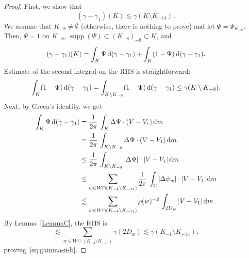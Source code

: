 \documentclass[11pt]{amsart}
\numberwithin{equation}{section}
\newcommand{\bC}{\mathbb C}
\begin{document}
\begin{proof}
First, we show that
\begin{equation}\label{eq:gamma-u-b}
(\gamma - \gamma_1)(K) \lesssim \gamma(K\setminus K_{-14})\,.
\end{equation}
We assume that $K_{-8}\ne\emptyset$ (otherwise, there is nothing to prove) and let
$\Psi=\Psi_{K_{-8}}$.  Then, $\Psi = 1 $ on $K_{-8}$,
$\operatorname{supp}(\Psi) \subset (K_{-8})_{+8} \subset K$, and
\[
(\gamma-\gamma_1)(K) = \int_K \Psi\, {\rm d}(\gamma-\gamma_1) + \int_K (1-\Psi)\, {\rm d}(\gamma-\gamma_1).
\]
Estimate of the second integral on the RHS is straightforward:
\[
\int_K (1-\Psi)\, {\rm d}(\gamma-\gamma_1) = \int_{K\setminus K_{-8}} (1-\Psi)\,
{\rm d}(\gamma-\gamma_1) \le \gamma (K\setminus K_{-8}).
\]
Next, by Green's identity, we get
\begin{align*}
\int_K \Psi\, {\rm d}(\gamma-\gamma_1) &= \frac1{2\pi}\, \int_K \Delta\Psi \cdot (V-V_1)\, {\rm d}m \\
&= \frac1{2\pi}\, \int_{K\setminus K_{-8}} \Delta\Psi \cdot (V-V_1)\, {\rm d}m \\
&\le \frac1{2\pi}\,  \int_{K\setminus K_{-8}} |\Delta\Psi| \cdot |V-V_1|\, {\rm d}m \\
&\le \sum_{w\in W\cap(K_{-4}\setminus K_{-11})} \frac1{2\pi}\, \int_{\bC} |\Delta\psi_w|\cdot |V-V_1|\,
{\rm d}m \\
&\lesssim \sum_{w\in W\cap(K_{-4}\setminus K_{-11})} \rho(w)^{-2}\, \int_{2D_w} |V-V_1|\, {\rm d}m\,.
\end{align*}
By Lemma~\ref{LemmaC}, the RHS is
\[
\lesssim \sum_{w\in W\cap(K_{-4}\setminus K_{-11})} \gamma(2D_w) \lesssim
\gamma(K_{-1}\setminus K_{-14}),
\]
proving~\eqref{eq:gamma-u-b}.


\end{proof}
\end{document}
